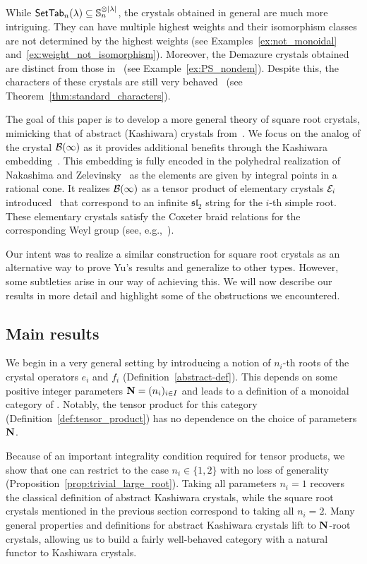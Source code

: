 \documentclass[11pt]{article}
\begin{document}
While $\mathsf{SetTab}_n(\lambda) \subseteq \mathbb{S}_n^{\otimes \lvert \lambda \rvert}$, the crystals obtained in general are much more intriguing. They can have multiple highest weights and their isomorphism classes are not determined by the highest weights (see  Examples~\ref{ex:not_monoidal} and~\ref{ex:weight_not_isomorphism}).
Moreover, the Demazure crystals obtained are distinct from those in~\cite{PS22} (see Example~\ref{ex:PS_nondem}).
Despite this, the characters of these crystals are still very behaved~\cite{MTY} (see  Theorem~\ref{thm:standard_characters}).


The goal of this paper is to develop a more general theory of square root crystals, mimicking that of abstract (Kashiwara) crystals from~\cite{Kashiwara93}.
We focus on the analog of the crystal $\mathcal{B}(\infty)$ as it provides additional benefits through the Kashiwara embedding~\cite{Kashiwara93}. This embedding is fully encoded in the polyhedral realization of Nakashima and Zelevinsky~\cite{Nakashima99,NZ97} as the elements are given by integral points in a rational cone.
It realizes $\mathcal{B}(\infty)$ as a tensor product of elementary crystals $\mathcal E_i$ introduced~\cite[Ex.~1.2.6]{Kashiwara93} that correspond to an infinite $\mathfrak{sl}_2$ string for the $i$-th simple root. These elementary crystals satisfy the Coxeter braid relations for the corresponding Weyl group (see, e.g.,~\cite[\S12.1]{BumpSchilling}).

Our intent was to realize a similar construction for square root crystals as an alternative way to prove Yu's results and generalize to other types. However, some subtleties arise in our way of  achieving this.
We will now describe our results in more detail and highlight some of the obstructions we encountered.

\subsection{Main results}

We begin in a very general setting by introducing a notion of $n_i$-th roots of the crystal operators $e_i$ and $f_i$ (Definition~\ref{abstract-def}).
This depends on some positive integer parameters $\mathbf{N}=(n_i)_{i \in I}$ and leads to a definition of a monoidal category of
.
Notably, the tensor product for this category (Definition~\ref{def:tensor_product}) has no dependence on the choice of parameters $\mathbf{N}$. 

Because of an important integrality condition required for tensor products, %
we show that one can restrict to the case $n_i \in\{ 1,2\}$ with no loss of generality (Proposition~\ref{prop:trivial_large_root}).
Taking all parameters $n_i=1$ recovers the classical definition of abstract Kashiwara crystals,
while the square root crystals mentioned in the previous section correspond to taking all $n_i=2$.
Many general properties and definitions for abstract Kashiwara crystals lift to $\mathbf{N}$-root crystals, allowing us to build a fairly well-behaved category with a natural functor to Kashiwara crystals.
\end{document}
